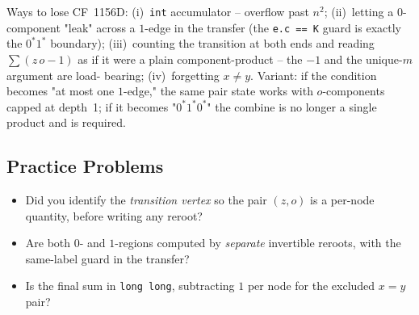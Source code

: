 
\begin{warningbox}
Ways to lose CF~1156D: (i)~\lstinline{int} accumulator -- overflow past $n^2$;
(ii)~letting a $0$-component "leak" across a $1$-edge in the transfer (the
\lstinline{e.c == K} guard is exactly the $0^{\ast}1^{\ast}$ boundary);
(iii)~counting the transition at both ends and reading $\sum(z\,o-1)$ as if it
were a plain component-product -- the $-1$ and the unique-$m$ argument are load-
bearing; (iv)~forgetting $x\ne y$. Variant: if the condition becomes "at most
one $1$-edge," the same pair state works with $o$-components capped at depth~1;
if it becomes "$0^{\ast}1^{\ast}0^{\ast}$" the combine is no longer a single
product and  is required.
\end{warningbox}

\subsection{Practice Problems}

\begin{stuckbox}
\begin{itemize}[nosep, leftmargin=1.4em]
  \item Did you identify the \emph{transition vertex} so the pair $(z,o)$ is a
        per-node quantity, before writing any reroot?
  \item Are both $0$- and $1$-regions computed by \emph{separate} invertible
        reroots, with the same-label guard in the transfer?
  \item Is the final sum in \lstinline{long long}, subtracting $1$ per node for
        the excluded $x=y$ pair?
\end{itemize}
\end{stuckbox}

